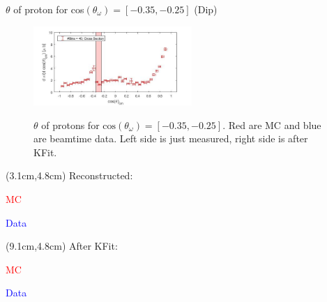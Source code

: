 \documentclass[
		10pt
		]{beamer}
\begin{document}
\begin{frame}{$ \theta$ of proton for cos$(\theta_{\omega})=[-0.35,-0.25]$ (Dip)}
	
	\begin{figure}
		\hspace{0cm}  \vspace{-1cm}
		\includegraphics[width=6cm]{Plots/7}
	\end{figure}
	
	
	\begin{figure}%
		\centering
		\qquad
		\captionsetup{labelformat=empty}
		\caption{$\theta$ of protons for $\textrm{cos}(\theta_{\omega}) = [-0.35, -0.25] $. Red are MC and blue are beamtime data. Left side is just measured, right side is after KFit.}%
		\label{fig:example}%
	\end{figure}
	
		\begin{textblock*}{4.5cm}(3.1cm,4.8cm)
		\footnotesize Reconstructed:
		
		\footnotesize \textcolor{red}{MC}
		
		\footnotesize \textcolor{blue}{Data}
	\end{textblock*}
	
	\begin{textblock*}{4.5cm}(9.1cm,4.8cm)
		\footnotesize After KFit:
		
		\footnotesize \textcolor{red}{MC}
		
		\footnotesize \textcolor{blue}{Data}
	\end{textblock*}
	
	
	
\end{frame}
\end{document}
